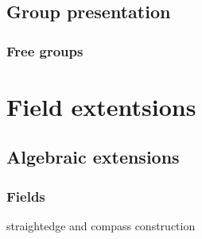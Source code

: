 \documentclass{../note}
\begin{document}
\chapter{Group presentation}

\section{Free groups}









\part{Field extentsions}

\chapter{Algebraic extensions}

\section{Fields}
\begin{prb}
\end{prb}
\begin{prb}
\end{prb}
\begin{prb}
\end{prb}
\begin{prb}
\end{prb}
straightedge and compass construction
\end{document}
